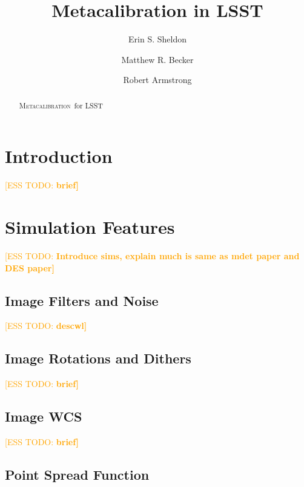 \documentclass[iop, twocolappendix, appendixfloats, numberedappendix, apj]{hackemulateapj}
\newcommand{\esstodo}[1]{\textcolor{orange}{[ESS TODO: \bf #1]}}
\newcommand{\Mcal}{\textsc{Metacalibration}}
\newcommand{\Mdet}{\textsc{Metadetection}}
\begin{document}



\title{Metacalibration in LSST}

\author{Erin S. Sheldon}
\author{Matthew R. Becker}
\author{Robert Armstrong}


\begin{abstract}

    \Mcal\ for LSST

\end{abstract}


\section{Introduction} \label{sec:intro}

\esstodo{brief}

\section{Simulation Features} \label{sec:simfeatures}

\esstodo{Introduce sims, explain much is same as mdet paper and DES paper}

\subsection{Image Filters and Noise} \label{sec:simfeatures:noise}
\esstodo{descwl}

\subsection{Image Rotations and Dithers} \label{sec:simfeatures:rotdith}
\esstodo{brief}
\subsection{Image WCS} \label{sec:simfeatures:wcs}
\esstodo{brief}
\subsection{Point Spread Function} \label{sec:simfeatures:psf}
\end{document}
